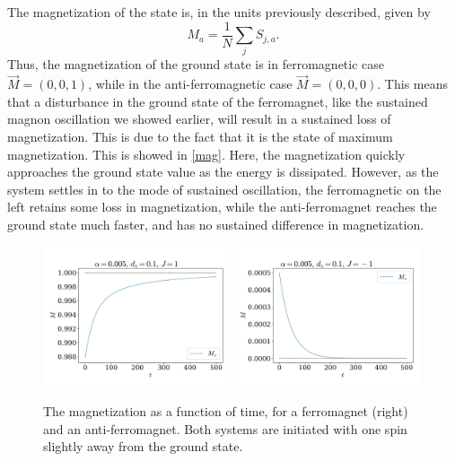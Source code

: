 \documentclass{article}
\begin{document}
    The magnetization of the state is, in the units previously described, given by
    \begin{equation*}
        M_a = \frac{1}{N} \sum_j S_{j, a}.
    \end{equation*}
    Thus, the magnetization of the ground state is in ferromagnetic case $\vec M = (0, 0, 1)$, while in the anti-ferromagnetic case $\vec M = (0, 0, 0)$.
    This means that a disturbance in the ground state of the ferromagnet, like the sustained magnon oscillation we showed earlier, will result in a sustained loss of magnetization.
    This is due to the fact that it is the state of maximum magnetization.
    This is showed in \autoref{mag}.
    Here, the magnetization quickly approaches the ground state value as the energy is dissipated.
    However, as the system settles in to the mode of sustained oscillation, the ferromagnetic on the left retains some loss in magnetization, while the anti-ferromagnet reaches the ground state much faster, and has no sustained difference in magnetization.


    \begin{figure}[H]
        \centering
        \includegraphics[width=0.49\textwidth]{../plots/mag.pdf}
        \includegraphics[width=0.49\textwidth]{../plots/mag2.pdf}
        \caption{The magnetization as a function of time, for a ferromagnet (right) and an anti-ferromagnet. Both systems are initiated with one spin slightly away from the ground state.}
        \label{mag}
    \end{figure}
\end{document}
